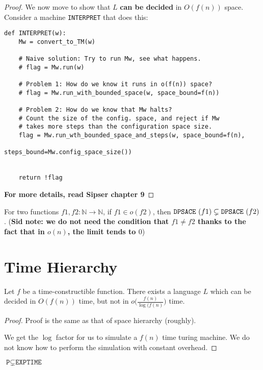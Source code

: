 \begin{proof}
We now move to show that $L$ \textbf{can be decided} in $O(f(n))$ space.
Consider a machine \texttt{INTERPRET} that does this:

\begin{verbatim}
def INTERPRET(w):
    Mw = convert_to_TM(w)

    # Naive solution: Try to run Mw, see what happens.
    # flag = Mw.run(w)

    # Problem 1: How do we know it runs in o(f(n)) space?
    # flag = Mw.run_with_bounded_space(w, space_bound=f(n))

    # Problem 2: How do we know that Mw halts?
    # Count the size of the config. space, and reject if Mw
    # takes more steps than the configuration space size.
    flag = Mw.run_wth_bounded_space_and_steps(w, space_bound=f(n), 
                                                 steps_bound=Mw.config_space_size())


    return !flag
\end{verbatim}
\textbf{For more details, read Sipser chapter 9}
\end{proof}



\begin{corollary}
For two functions $f1, f2 : \mathbb{N} \to \mathbb{N}$, if
$f1 \in o(f2)$, then $\texttt{DPSACE}~(f1) \subsetneq \texttt{DPSACE}~(f2)$. 
(\textbf{Sid note: we do not need the condition that $f1 \neq f2$ thanks to the fact
that in $o(n)$, the limit tends to $0$})
\end{corollary}

\section{Time Hierarchy}

\begin{theorem}
Let $f$ be a time-constructible function. There exists a language $L$ which
can be decided in $O(f(n))$ time, but not in $o \bigg(\frac{f(n)}{\log(f(n)} \bigg)$ time.
\end{theorem}
\begin{proof}
Proof is the same as that of space hierarchy (roughly).

We get the $\log$ factor for us to simulate a $f(n)$ time turing machine.
We do not know how to perform the simulation with constant overhead.
\end{proof}

\begin{corollary} $\texttt{P} \subsetneq \texttt{EXPTIME}$ \end{corollary}


